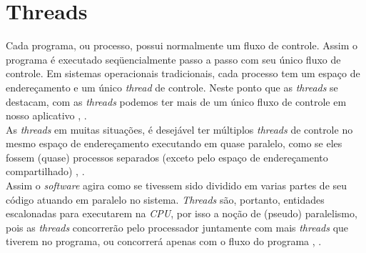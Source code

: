 \newpage
\section{Threads}\label{sec:Threads}


Cada programa, ou processo, possui normalmente um fluxo de controle. Assim o programa é executado seqüencialmente passo a passo com seu único fluxo de controle. Em sistemas operacionais tradicionais, cada processo tem um espaço de endereçamento e um único \emph{thread} de controle. Neste ponto que as \emph{threads} se destacam, com as \emph{threads} podemos ter mais de um único fluxo de controle em nosso aplicativo \cite{Tanenbaum2016}, \cite{dev2020}.\\
As \emph{threads} em  muitas situações, é desejável ter múltiplos \emph{threads} de controle no mesmo espaço de endereçamento executando em quase paralelo, como se eles fossem (quase) processos separados (exceto pelo espaço de endereçamento compartilhado) \cite{Tanenbaum2016}, \cite{dev2020}.\\
Assim o \emph{software} agira como se tivessem sido dividido em varias partes de seu código atuando em paralelo no sistema. \emph{Threads} são, portanto, entidades escalonadas para executarem na \emph{CPU}, por isso a noção de (pseudo) paralelismo, pois as \emph{threads} concorrerão pelo processador juntamente com mais \emph{threads} que tiverem no programa, ou concorrerá apenas com o fluxo do programa \cite{Tanenbaum2016}, \cite{dev2020}.
